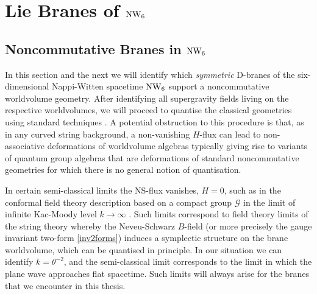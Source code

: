\chapter{Lie Branes of $\operatorname{NW}_6$}
\label{liebranes}
\section{Noncommutative Branes in $\operatorname{NW}_6$}
\label{NCBranes}
In this section and the next we will identify which {\it symmetric} D-branes of
the six-dimensional Nappi-Witten spacetime $\operatorname{NW}_6$ support a noncommutative
worldvolume geometry. After identifying all supergravity fields living on the
respective worldvolumes, we will proceed to quantise the classical geometries
using standard techniques \cite{Schom1}. A potential obstruction to this
procedure is that, as in any curved string background, a non-vanishing $H$-flux
can lead to non-associative deformations of worldvolume algebras typically
giving rise to variants of quantum group algebras that are deformations of
standard noncommutative geometries for which there is no general notion of
quantisation.

In certain semi-classical limits the NS-flux vanishes, $H=0$, such as in the
conformal field theory description based on a compact group $\mathcal{G}$ in the
limit of infinite Kac-Moody level $k\to\infty$ \cite{ARS1}. Such limits
correspond to field theory limits of the string theory whereby the Neveu-Schwarz
$B$-field (or more precisely the gauge invariant two-form \eqref{inv2forms})
induces a symplectic structure on the brane worldvolume, which can be quantised
in principle. In our situation we can identify $k=\theta^{-2}$, and the
semi-classical limit corresponds to the limit in which the plane wave approaches
flat spacetime. Such limits will always arise for the branes that we encounter
in this thesis.

